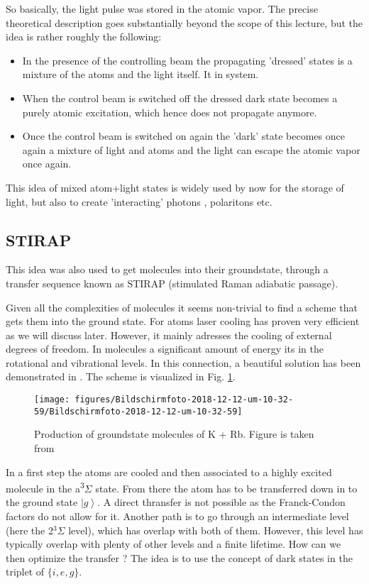 \documentclass[10pt]{article}
\let\cite\citep
\providecommand\citep{\cite}
\newcommand{\ket}[1]{\ensuremath{\left|#1\right\rangle}}
\begin{document}
So basically, the light pulse was stored in the atomic vapor. The precise theoretical description goes substantially beyond the scope of this lecture, but the idea is rather roughly the following:
\begin{itemize}
\item In the presence of the controlling beam the propagating 'dressed' states is a mixture of the atoms and the light itself. It  in system.
\item When the control beam is switched off the dressed dark state becomes a purely atomic excitation, which hence does not propagate anymore.
\item Once the control beam is switched on again the 'dark' state becomes once again a mixture of light and atoms and the light can escape the atomic vapor once again.
\end{itemize}

This idea of mixed atom+light states is widely used by now for the storage of light, but also to create 'interacting' photons \cite{Firstenberg_2013}, polaritons etc. 
\subsection{STIRAP}

This idea was also used to get molecules into their groundstate, through a transfer sequence known as STIRAP (stimulated Raman adiabatic passage). 

Given all the complexities of molecules it seems non-trivial to find a scheme that gets them into the ground state. For atoms laser cooling has proven very efficient as we will discuss later. However, it mainly adresses the cooling of external degrees of freedom. In molecules a significant amount of energy its in the rotational and vibrational levels. In this connection, a beautiful solution has been demonstrated in \cite{Ni_2008}. The scheme is visualized in Fig. \ref{304719}.
\begin{figure}[h!]
\begin{center}
\texttt{[image: figures/Bildschirmfoto-2018-12-12-um-10-32-59/Bildschirmfoto-2018-12-12-um-10-32-59]}
\caption{{Production of groundstate molecules of K + Rb. Figure is taken from
\protect\cite{Ni_2008}
{\label{304719}}%
}}
\end{center}
\end{figure}



In a first step the atoms are cooled and then associated to a highly excited molecule in the a\textsuperscript{3}$\Sigma$ state. From there the atom has to be transferred down in to the ground state $\ket{g}$. A direct thransfer is not possible as the Franck-Condon factors do not allow for it. Another path is to go through an intermediate level (here the 2$^3 \Sigma$ level), which has overlap with both of them. However, this level has typically overlap with plenty of other levels and a finite lifetime. How can we then optimize the transfer ? The idea is to use the concept of dark states in the triplet of $\{i, e, g\}$.
\end{document}
